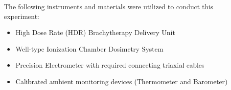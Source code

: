 The following instruments and materials were utilized to conduct this experiment:
\begin{itemize}
    \item High Dose Rate (HDR) Brachytherapy Delivery Unit
    \item Well-type Ionization Chamber Dosimetry System
    \item Precision Electrometer with required connecting triaxial cables
    \item Calibrated ambient monitoring devices (Thermometer and Barometer)
\end{itemize}